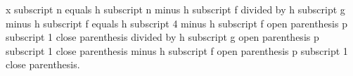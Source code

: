 x subscript n equals h subscript n minus h subscript f divided by h subscript g minus h subscript f equals h subscript 4 minus h subscript f open parenthesis p subscript 1 close parenthesis divided by h subscript g open parenthesis p subscript 1 close parenthesis minus h subscript f open parenthesis p subscript 1 close parenthesis.
